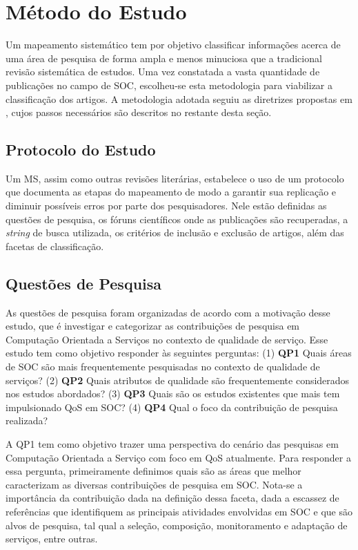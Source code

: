 
\section{Método do Estudo}\label{sec:review_method}

Um mapeamento sistemático tem por objetivo classificar informações acerca de uma área de pesquisa de forma ampla e menos minuciosa que a tradicional revisão sistemática de estudos. Uma vez constatada a vasta quantidade de publicações no campo de SOC, escolheu-se esta metodologia para viabilizar a classifica\c c\~{a}o dos artigos. A metodologia adotada seguiu as diretrizes propostas em \cite{petersen:sms2008}, cujos passos necess\'{a}rios s\~{a}o descritos no restante desta se\c c\~{a}o.

\subsection{Protocolo do Estudo}

Um MS, assim como outras revisões literárias, estabelece o uso de um protocolo que documenta as etapas do mapeamento de modo a garantir sua replicação e diminuir possíveis erros por parte dos pesquisadores. Nele estão definidas as questões de pesquisa, os fóruns científicos onde as publicações s\~{a}o recuperadas, a \textit{string} de busca utilizada, os critérios de inclusão e exclusão de artigos, além das facetas de classificação.

\subsection{Quest\~{o}es de Pesquisa}\label{sec:questoesPesquisa}

As questões de pesquisa foram organizadas de acordo com a motivação desse estudo, que é investigar e categorizar as contribuições de pesquisa em Computação Orientada a Serviços no contexto de qualidade de serviço. Esse estudo tem como objetivo responder às seguintes perguntas: (1) \textbf{QP1} Quais áreas de SOC são mais frequentemente pesquisadas no contexto de qualidade de serviços? (2) \textbf{QP2} Quais atributos de qualidade são frequentemente considerados nos estudos abordados? (3) \textbf{QP3} Quais s\~{a}o os estudos existentes que mais tem impulsionado QoS em SOC? (4) \textbf{QP4} Qual o foco da contribuição de pesquisa realizada?

A QP1 tem como objetivo trazer uma perspectiva do cen\'{a}rio das pesquisas em Computa\c{c}\~{a}o Orientada a Servi\c{c}o com foco em QoS atualmente. Para responder a essa pergunta, primeiramente definimos quais s\~{a}o as \'{a}reas que melhor caracterizam as diversas contribui\c{c}\~{o}es de pesquisa em SOC. Nota-se a importância da contribuição dada na definição dessa faceta, dada a escassez de referências que identifiquem as principais atividades envolvidas em SOC e que são alvos de pesquisa, tal qual a seleção, composição, monitoramento e adaptação de serviços, entre outras.

